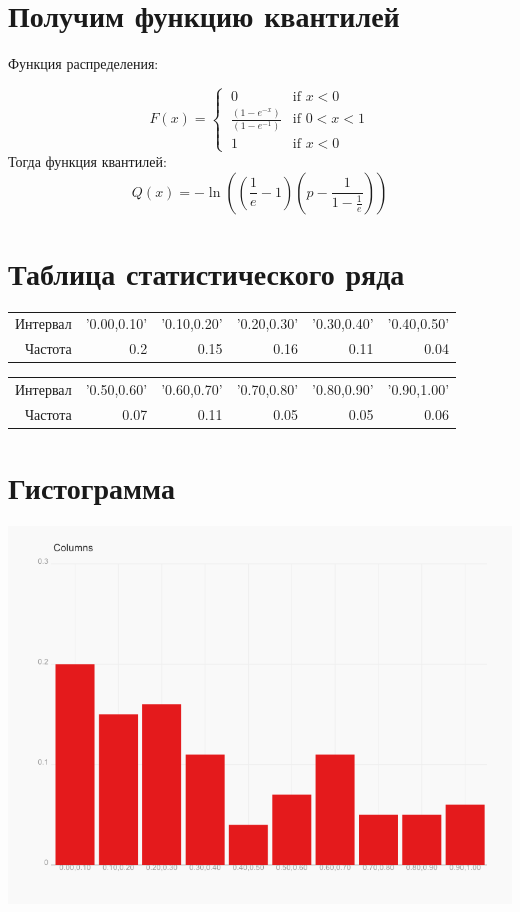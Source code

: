 \documentclass{article}
\begin{document}
\section{Получим функцию квантилей}
Функция распределения:

\[
 F(x) = 
  \begin{cases} 
   \ 0 & \text{if } x < 0 \\
   \ \frac{(1 - e^{-x})}{(1 - e^{-1})} & \text{if } 0 < x < 1 \\
   \ 1 & \text{if } x < 0
  \end{cases}
\]
Тогда функция квантилей:
\[
 Q(x) = -\ln{((\frac{1}{e} - 1)(p - \frac{1}{1 - \frac{1}{e}}))}
\]

\section{Таблица статистического ряда}
\begin{tabular}{| r | r | r | r | r | r | }
  \hline			
Интервал & '0.00,0.10' & '0.10,0.20' & '0.20,0.30' & '0.30,0.40' & '0.40,0.50' \\
Частота & 0.2 & 0.15 & 0.16 & 0.11 & 0.04\\
  \hline  
\end{tabular}

\medskip

\begin{tabular}{| r | r | r | r | r | r | }
  \hline			
Интервал & '0.50,0.60' & '0.60,0.70' & '0.70,0.80' & '0.80,0.90' & '0.90,1.00'\\
Частота & 0.07 & 0.11 & 0.05 & 0.05 & 0.06\\
  \hline  
\end{tabular}

\section{Гистограмма}



\includegraphics[scale=0.7]{columns.jpg}
\end{document}
